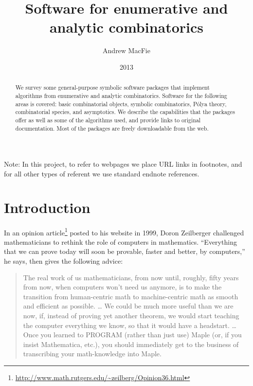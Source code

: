 \documentclass[12pt]{article}
\theoremstyle{plain}
\begin{document}
\title{Software for enumerative and analytic combinatorics}
\author{Andrew MacFie}
\date{2013}
\maketitle

\begin{abstract}
We survey some general-purpose symbolic software packages that implement
algorithms from enumerative and analytic combinatorics.
Software for the following areas is covered:
basic combinatorial objects,
symbolic combinatorics,
P\'olya theory,
combinatorial species, and
asymptotics.
We describe the capabilities that the packages offer as well as some of the
algorithms used, and provide links to original documentation.
Most of the packages are freely downloadable from the web.
\end{abstract}

Note: In this project, to refer to webpages
we place URL links in footnotes, and for all other types of referent we use standard endnote references.

\tableofcontents

\section{Introduction}
\label{sec:introduction}
In an opinion article\footnote{
 \url{http://www.math.rutgers.edu/~zeilberg/Opinion36.html}
} posted to his website in 1999, Doron Zeilberger challenged mathematicians to rethink the role of computers in mathematics.
``Everything that we can prove today will soon be provable, faster and better, by computers,''
he says, then gives the following advice:
\begin{quote}
The real work of us mathematicians, from now until, roughly, fifty years from now, when computers won't need us anymore, is to make the transition from human-centric math to machine-centric math as smooth and efficient as possible. \dots
 We could be much more useful than we are now, if, instead of proving yet another theorem, we would start teaching the computer everything we know, so that it would have a headstart. \dots
 Once you learned to PROGRAM (rather than just use) Maple (or, if you insist Mathematica, etc.), you should immediately get to the business of transcribing your math-knowledge into Maple.
\end{quote}
\end{document}
